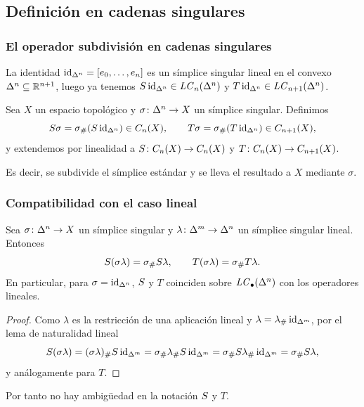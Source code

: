 \subsection{Definición en cadenas singulares}

\begin{frame}
  \frametitle{El operador subdivisión en cadenas singulares}

  La identidad $\operatorname{id}_{\Delta^{n}}=[e_0,\ldots,e_n]$ es un símplice singular
  lineal en el convexo $\Delta^{n}\subseteq\mathbb{R}^{n+1}$, luego ya tenemos
  $S\operatorname{id}_{\Delta^{n}}\in\mathit{LC}_n(\Delta^{n})$ y
  $T\operatorname{id}_{\Delta^{n}}\in\mathit{LC}_{n+1}(\Delta^{n})$.

  \begin{definition}
    Sea $X$ un espacio topológico y $\sigma\colon\Delta^{n}\to X$ un
    símplice singular. Definimos
    \[
      S\sigma=\sigma_\#(S\operatorname{id}_{\Delta^{n}})\in C_n(X),
      \qquad
      T\sigma=\sigma_\#(T\operatorname{id}_{\Delta^{n}})\in C_{n+1}(X),
    \]
    y extendemos por linealidad a
    $S\colon C_n(X)\to C_n(X)$ y $T\colon C_n(X)\to C_{n+1}(X)$.
  \end{definition}

  \medskip

  Es decir, se subdivide el símplice estándar y se lleva el resultado a $X$
  mediante $\sigma$.
\end{frame}

\begin{frame}
  \frametitle{Compatibilidad con el caso lineal}

  \begin{lemma}[de compatibilidad]
    Sea $\sigma\colon\Delta^{n}\to X$ un símplice singular y
    $\lambda\colon\Delta^{m}\to\Delta^{n}$ un símplice singular lineal.
    Entonces
    \[
      S(\sigma\lambda)=\sigma_\#S\lambda,
      \qquad
      T(\sigma\lambda)=\sigma_\#T\lambda.
    \]
    En particular, para $\sigma=\operatorname{id}_{\Delta^{n}}$, $S$ y $T$ coinciden
    sobre $\mathit{LC}_\bullet(\Delta^{n})$ con los operadores lineales.
  \end{lemma}

  \begin{proof}
    Como $\lambda$ es la restricción de una aplicación lineal y
    $\lambda=\lambda_\#\operatorname{id}_{\Delta^{m}}$, por el lema de naturalidad lineal
    \[
      S(\sigma\lambda)=(\sigma\lambda)_\#S\operatorname{id}_{\Delta^{m}}
      =\sigma_\#\lambda_\#S\operatorname{id}_{\Delta^{m}}
      =\sigma_\#S\lambda_\#\operatorname{id}_{\Delta^{m}}
      =\sigma_\#S\lambda,
    \]
    y análogamente para $T$.
  \end{proof}

  Por tanto no hay ambigüedad en la notación $S$ y $T$.
\end{frame}

